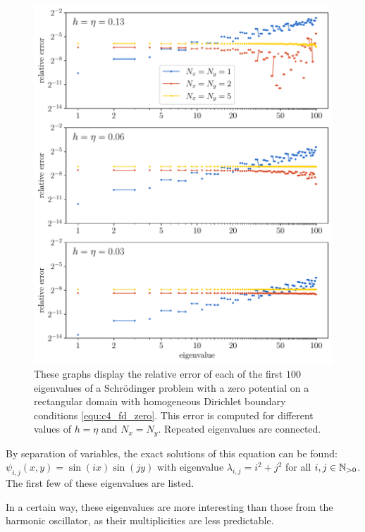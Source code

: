 \begin{figure}
    \begin{center}
        \includegraphics[width=\textwidth]{img/chapter4/fd_zero.pdf}
    \end{center}
    \caption{These graphs display the relative error of each of the first $100$ eigenvalues of a Schrödinger problem with a zero potential on a rectangular domain with homogeneous Dirichlet boundary conditions \eqref{equ:c4_fd_zero}. This error is computed for different values of $h = \eta$ and $N_x = N_y$. Repeated eigenvalues are connected.}
    \label{fig:c4_fd_zero}
\end{figure}

By separation of variables, the exact solutions of this equation can be found: $\psi_{i, j}(x, y) = \sin(i x)\sin(j y)$ with eigenvalue $\lambda_{i,j} = i^2 + j^2$ for all $i, j \in \mathbb{N}_{>0}$. The first few of these eigenvalues are listed.

In a certain way, these eigenvalues are more interesting than those from the harmonic oscillator, as their multiplicities are less predictable.

